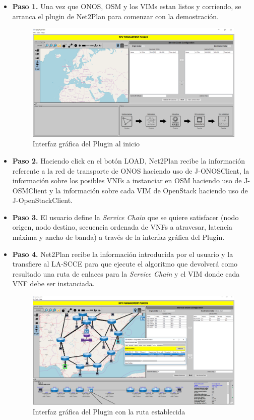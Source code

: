 \begin{itemize}
	
	\item \textbf{Paso 1.} Una vez que \ac{ONOS}, \ac{OSM} y los \acp{VIM} estan listos y corriendo, se arranca el plugin de Net2Plan para comenzar con la demostración.
	
	\begin{figure}[!ht]
		\centering
		\includegraphics[width=0.9\linewidth]{imagenes/nfvplugin_dashboard}
		\caption{Interfaz gráfica del Plugin al inicio}
		\label{fig:nfvproof_inicio}
	\end{figure}
	
	\item \textbf{Paso 2.} Haciendo click en el botón LOAD, Net2Plan recibe la información referente a la red de transporte de \ac{ONOS} haciendo uso de J-ONOSClient, la información sobre los posibles \acp{VNF} a instanciar en \ac{OSM} haciendo uso de J-OSMClient y la información sobre cada \ac{VIM} de OpenStack haciendo uso de J-OpenStackClient.
	
	\item \textbf{Paso 3.} El usuario define la \textit{Service Chain} que se quiere satisfacer (nodo origen, nodo destino, secuencia ordenada de VNFs a atravesar, latencia máxima y ancho de banda) a través de la interfaz gráfica del Plugin.
	
	\item \textbf{Paso 4.} Net2Plan recibe la información introducida por el usuario y la transfiere al \ac{LA-SCCE} para que ejecute el algoritmo que devolverá como resultado una ruta de enlaces para la \textit{Service Chain} y el \ac{VIM} donde cada \ac{VNF} debe ser instanciada.
	
		\begin{figure}[!ht]
		\centering
		\includegraphics[width=0.9\linewidth]{imagenes/nfv_service_chain}
		\caption{Interfaz gráfica del Plugin con la ruta establecida}
		\label{fig:nfvservicechain}
	\end{figure}
	

\end{itemize}
